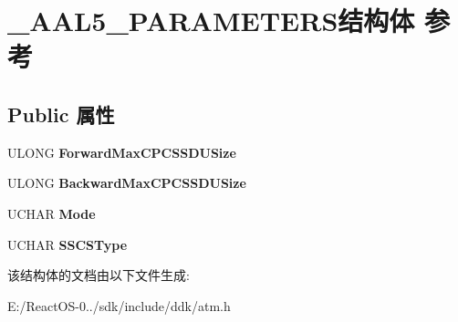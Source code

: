 \hypertarget{struct___a_a_l5___p_a_r_a_m_e_t_e_r_s}{}\section{\+\_\+\+A\+A\+L5\+\_\+\+P\+A\+R\+A\+M\+E\+T\+E\+R\+S结构体 参考}
\label{struct___a_a_l5___p_a_r_a_m_e_t_e_r_s}
\subsection*{Public 属性}
\begin{DoxyCompactItemize}
\item 
\mbox{\label{struct___a_a_l5___p_a_r_a_m_e_t_e_r_s_a2440b570960855ea7f1f3cbb2e7980a5}} 
U\+L\+O\+NG {\bfseries Forward\+Max\+C\+P\+C\+S\+S\+D\+U\+Size}
\item 
\mbox{\label{struct___a_a_l5___p_a_r_a_m_e_t_e_r_s_a2499d17b273b0466f7b9f2f57a226434}} 
U\+L\+O\+NG {\bfseries Backward\+Max\+C\+P\+C\+S\+S\+D\+U\+Size}
\item 
\mbox{\label{struct___a_a_l5___p_a_r_a_m_e_t_e_r_s_a3923d40d4b655b86bbcd5b004273afd7}} 
U\+C\+H\+AR {\bfseries Mode}
\item 
\mbox{\label{struct___a_a_l5___p_a_r_a_m_e_t_e_r_s_a90c904a7e71def02ff489d2c535b6ae4}} 
U\+C\+H\+AR {\bfseries S\+S\+C\+S\+Type}
\end{DoxyCompactItemize}


该结构体的文档由以下文件生成\+:\begin{DoxyCompactItemize}
\item 
E\+:/\+React\+O\+S-\/0../sdk/include/ddk/atm.\+h\end{DoxyCompactItemize}
